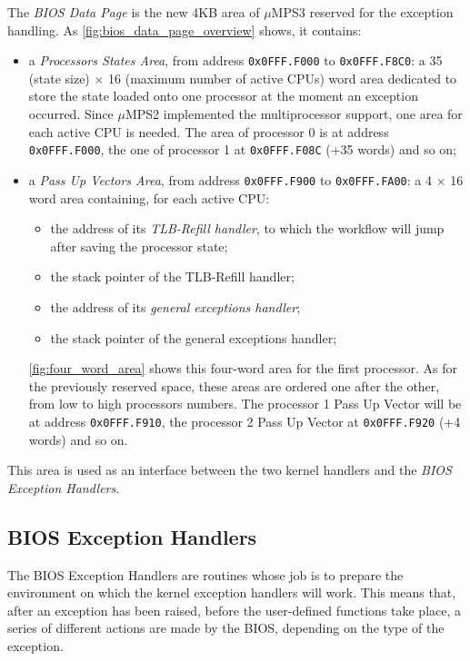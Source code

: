 \documentclass[12pt,a4paper,openright,twoside]{report}
\begin{document}
The \textit{BIOS Data Page} is the new 4KB area of $\mu$MPS3 reserved for the exception handling.
As \autoref{fig:bios_data_page_overview} shows, it contains:
\begin{itemize}
	\item a \textit{Processors States Area}, from address \texttt{0x0FFF.F000} to \texttt{0x0FFF.F8C0}: a 35 (state size) $\times$ 16 (maximum number of active CPUs) word area dedicated to store the state loaded onto one processor at the moment an exception occurred.
	      Since $\mu$MPS2 implemented the multiprocessor support, one area for each active CPU is needed.
	      The area of processor 0 is at address \texttt{0x0FFF.F000}, the one of processor 1 at \texttt{0x0FFF.F08C} (+35 words) and so on;
	\item a \textit{Pass Up Vectors Area}, from address \texttt{0x0FFF.F900} to \texttt{0x0FFF.FA00}: a 4 $\times$ 16 word area containing, for each active CPU:
	      \begin{itemize}
		      \item the address of its \textit{TLB-Refill handler}, to which the workflow will jump after saving the processor state;
		      \item the stack pointer of the TLB-Refill handler;
		      \item the address of its \textit{general exceptions handler};
		      \item the stack pointer of the general exceptions handler;
	      \end{itemize}
	      \autoref{fig:four_word_area} shows this four-word area for the first processor.
	      As for the previously reserved space, these areas are ordered one after the other, from low to high processors numbers.
	      The processor 1 Pass Up Vector will be at address \texttt{0x0FFF.F910}, the processor 2 Pass Up Vector at \texttt{0x0FFF.F920} (+4 words) and so on.
\end{itemize}
This area is used as an interface between the two kernel handlers and the \textit{BIOS Exception Handlers}.

\subsection{BIOS Exception Handlers}
\label{chap:bios_exception_handlers}
The BIOS Exception Handlers are routines whose job is to prepare the environment on which the kernel exception handlers will work.
This means that, after an exception has been raised, before the user-defined functions take place, a series of different actions are made by the BIOS, depending on the type of the exception.
\end{document}
